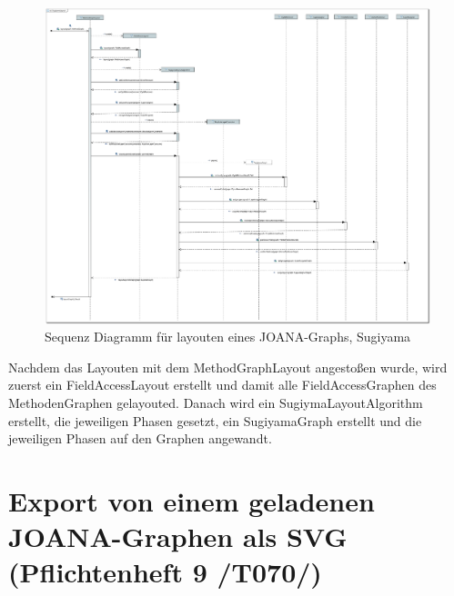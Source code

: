 \begin{figure}[!htbp]
	\centering
	\includegraphics[width=450pt]{resourcen/SeqDiagramSugiyama.PDF}
	\caption{Sequenz Diagramm für layouten eines JOANA-Graphs, Sugiyama}
	\label{fig:seq:layoutSugi}
\end{figure}

Nachdem das Layouten mit dem MethodGraphLayout angestoßen wurde, wird zuerst ein FieldAccessLayout erstellt und damit alle FieldAccessGraphen des MethodenGraphen gelayouted. Danach wird ein SugiymaLayoutAlgorithm erstellt, die jeweiligen Phasen gesetzt, ein SugiyamaGraph erstellt und die jeweiligen Phasen auf den Graphen angewandt.

\newpage
\section{Export von einem geladenen JOANA-Graphen als SVG (Pflichtenheft 9 /T070/)}